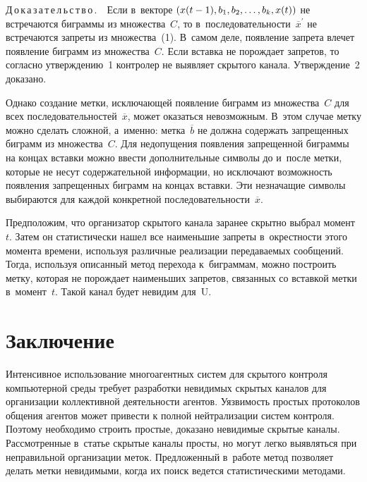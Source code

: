 \begin{multicols}{2}
  \smallskip

  \noindent
  Д\,о\,к\,а\,з\,а\,т\,е\,л\,ь\,с\,т\,в\,о\,.\ \ Если в~векторе $(x(t\hm-
1),b_1,b_2,\ldots ,b_k,x(t))$ не встречаются биграммы из множества~$C$, то
в~последовательности~$\overline{x}^\prime$ не встречаются запреты из
множества~(1). В~самом деле, появление запрета влечет появление биграмм из
множества~$C$. Если вставка не порождает запретов, то согласно
утверждению~1 контролер не выявляет скрытого канала. Утверждение~2
доказано.

  \smallskip

  Однако создание метки, исключающей появление биграмм из множества~$C$
для всех последовательностей~$\overline{x}$, может оказаться невозможным.
В~этом случае метку можно сделать сложной, а~именно: метка~$\overline{b}$
не должна содержать запрещенных биграмм из множества~$C$. Для
недопущения появления запрещенной биграммы на концах вставки можно
ввести дополнительные символы до и~после метки, которые не несут
содержательной информации, но исключают возможность появления
запрещенных биграмм на концах вставки. Эти незначащие символы
выбираются для каждой конкретной последовательности~$\overline{x}$.

  Предположим, что организатор скрытого канала заранее скрытно выбрал
момент~$t$. Затем он статистически нашел все наименьшие запреты
в~окрестности этого момента времени, используя различные реализации
передаваемых сообщений. Тогда, используя описанный метод перехода
к~биграммам, можно построить метку, которая не порождает наименьших
запретов, связанных со вставкой метки в~момент~$t$. Такой канал будет
невидим для~U.

\vspace*{-6pt}

\section{Заключение}

  Интенсивное использование многоагентных систем для скрытого контроля
компьютерной среды требует разработки невидимых скрытых каналов для
организации коллективной деятельности агентов. Уязвимость простых
протоколов общения агентов может привести к полной нейтрализации систем
контроля. Поэтому необходимо строить простые, доказано невидимые скрытые
каналы. Рассмотренные в~статье скрытые каналы просты, но могут легко
выявляться при неправильной организации меток. Предложенный в~работе
метод позволяет делать метки невидимыми, когда их поиск ведется
статистическими методами.


\end{multicols}
